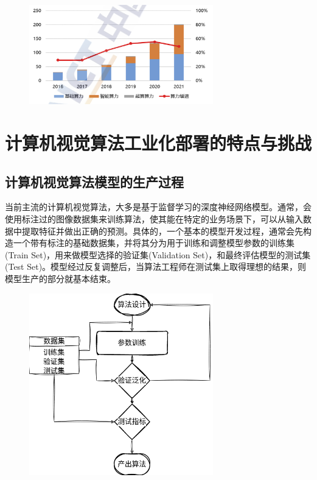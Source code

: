 \documentclass[master]{shtthesis}
\begin{document}
\begin{figure}[htbp]
	\centering
	\includegraphics[width=8cm]{img/1.png}
	\label{2022年中国算力发展状况}
\end{figure}

\section{计算机视觉算法工业化部署的特点与挑战}\label{计算机视觉算法工业化部署的特点与挑战}
\subsection{计算机视觉算法模型的生产过程}
当前主流的计算机视觉算法，大多是基于监督学习的深度神经网络模型。通常，会使用标注过的图像数据集来训练算法，使其能在特定的业务场景下，可以从输入数据中提取特征并做出正确的预测。具体的，一个基本的模型开发过程，通常会先构造一个带有标注的基础数据集，并将其分为用于训练和调整模型参数的训练集(Train Set)，用来做模型选择的验证集(Validation Set)，和最终评估模型的测试集(Test Set)。模型经过反复调整后，当算法工程师在测试集上取得理想的结果，则模型生产的部分就基本结束。

\begin{figure}[htbp]
	\centering
	\includegraphics[width=8cm]{img/2.png}
	\label{计算机视觉算法模型的生产过程}
\end{figure}
\end{document}
